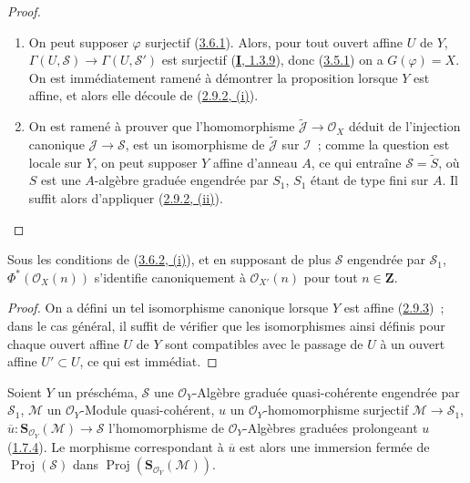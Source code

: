 \begin{proof}
\begin{enumerate}
  \item[\rm(i)] On peut supposer $\varphi$ surjectif
    (\hyperref[II.3.6.1-fr]{3.6.1}). Alors, pour tout ouvert affine $U$ de
    $Y$, $\Gamma(U,\mathcal{S})\to\Gamma(U,\mathcal{S}')$ est surjectif
    (\hyperref[I.1.3.9-fr]{\textbf{I}, 1.3.9}), donc
    (\hyperref[II.3.5.1-fr]{3.5.1}) on a $G(\varphi)=X$. On est
    immédiatement ramené à démontrer la proposition lorsque $Y$ est affine,
    et alors elle découle de (\hyperref[II.2.9.2-fr]{2.9.2, (i)}).
  \item[\rm(ii)] On est ramené à prouver que l'homomorphisme
    $\widetilde{\mathcal{J}}\to\mathcal{O}_X$ déduit de l'injection canonique
    $\mathcal{J}\to\mathcal{S}$, est un isomorphisme de
    $\widetilde{\mathcal{J}}$ sur $\mathcal{I}$~; comme la question est locale
    sur $Y$, on peut supposer $Y$ affine d'anneau $A$, ce qui entraîne
    $\mathcal{S}=\widetilde{S}$, où $S$ est une $A$-algèbre graduée engendrée
    par $S_1$, $S_1$ étant de type fini sur $A$. Il suffit alors d'appliquer
    (\hyperref[II.2.9.2-fr]{2.9.2, (ii)}).
\end{enumerate}
\end{proof}

\begin{corollary}[3.6.3]
\label{II.3.6.3-fr}
Sous les conditions de \textup{(\hyperref[II.3.6.2-fr]{3.6.2, (i)})}, et en supposant
de plus $\mathcal{S}$ engendrée par $\mathcal{S}_1$,
$\Phi^*(\mathcal{O}_X(n))$ s'identifie canoniquement à
$\mathcal{O}_{X'}(n)$ pour tout $n\in\mathbf{Z}$.
\end{corollary}

\begin{proof}
On a défini un tel isomorphisme canonique lorsque $Y$ est affine
(\hyperref[II.2.9.3-fr]{2.9.3})~; dans le cas général, il suffit de vérifier
que les isomorphismes ainsi définis pour chaque ouvert affine $U$ de $Y$ sont
compatibles avec le passage de $U$ à un ouvert affine $U'\subset U$, ce qui
est immédiat.
\end{proof}

\begin{corollary}[3.6.4]
\label{II.3.6.4-fr}
Soient $Y$ un préschéma, $\mathcal{S}$ une $\mathcal{O}_Y$-Algèbre graduée
quasi-cohérente engendrée par $\mathcal{S}_1$, $\mathcal{M}$ un
$\mathcal{O}_Y$-Module quasi-cohérent, $u$ un $\mathcal{O}_Y$-homomorphisme
surjectif $\mathcal{M}\to\mathcal{S}_1$,
$\overline{u}:\mathbf{S}_{\mathcal{O}_Y}(\mathcal{M})\to\mathcal{S}$
l'homomorphisme de $\mathcal{O}_Y$-Algèbres graduées prolongeant $u$
\textup{(\hyperref[II.1.7.4-fr]{1.7.4})}. Le morphisme correspondant à
$\overline{u}$ est alors une immersion fermée de
$\operatorname{Proj}(\mathcal{S})$ dans
$\operatorname{Proj}(\mathbf{S}_{\mathcal{O}_Y}(\mathcal{M}))$.
\end{corollary}

